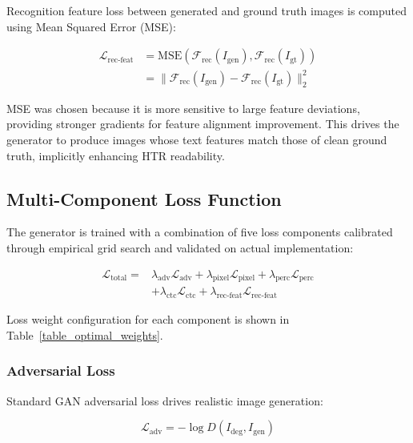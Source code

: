 \documentclass[journal]{IEEEtran}
\begin{document}
Recognition feature loss between generated and ground truth images is computed using Mean Squared Error (MSE):

\begin{equation}
\begin{split}
\mathcal{L}_{\text{rec-feat}} &= \text{MSE}(\mathcal{F}_{\text{rec}}(I_{\text{gen}}), \mathcal{F}_{\text{rec}}(I_{\text{gt}})) \\
&= \|\mathcal{F}_{\text{rec}}(I_{\text{gen}}) - \mathcal{F}_{\text{rec}}(I_{\text{gt}})\|_2^2
\end{split}
\end{equation}

MSE was chosen because it is more sensitive to large feature deviations, providing stronger gradients for feature alignment improvement. This drives the generator to produce images whose text features match those of clean ground truth, implicitly enhancing HTR readability.

\subsection{Multi-Component Loss Function}

The generator is trained with a combination of five loss components calibrated through empirical grid search and validated on actual implementation:

\begin{equation}
\begin{split}
\mathcal{L}_{\text{total}} = &\lambda_{\text{adv}}\mathcal{L}_{\text{adv}} + \lambda_{\text{pixel}}\mathcal{L}_{\text{pixel}} + \lambda_{\text{perc}}\mathcal{L}_{\text{perc}} \\
&+ \lambda_{\text{ctc}}\mathcal{L}_{\text{ctc}} + \lambda_{\text{rec-feat}}\mathcal{L}_{\text{rec-feat}}
\end{split}
\end{equation}

Loss weight configuration for each component is shown in Table~\ref{table_optimal_weights}.

\subsubsection{Adversarial Loss}

Standard GAN adversarial loss drives realistic image generation:

\begin{equation}
\mathcal{L}_{\text{adv}} = -\log D(I_{\text{deg}}, I_{\text{gen}})
\end{equation}
\end{document}
